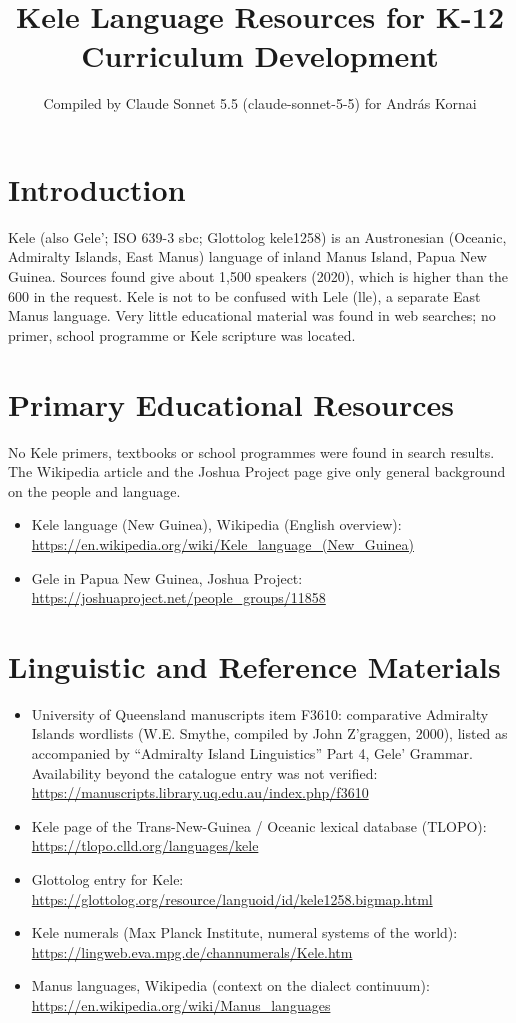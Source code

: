 \documentclass[12pt]{article}
\title{Kele Language Resources for K-12 Curriculum Development}
\author{Compiled by Claude Sonnet 5.5 (claude-sonnet-5-5) for Andr\'as Kornai}
\date{}
\begin{document}
\maketitle

\section{Introduction}
Kele (also Gele'; ISO 639-3 sbc; Glottolog kele1258) is an Austronesian (Oceanic, Admiralty Islands, East Manus) language of inland Manus Island, Papua New Guinea. Sources found give about 1,500 speakers (2020), which is higher than the 600 in the request. Kele is not to be confused with Lele (lle), a separate East Manus language. Very little educational material was found in web searches; no primer, school programme or Kele scripture was located.

\section{Primary Educational Resources}
No Kele primers, textbooks or school programmes were found in search results. The Wikipedia article and the Joshua Project page give only general background on the people and language.
\begin{itemize}
\item Kele language (New Guinea), Wikipedia (English overview): \url{https://en.wikipedia.org/wiki/Kele_language_(New_Guinea)}
\item Gele in Papua New Guinea, Joshua Project: \url{https://joshuaproject.net/people_groups/11858}
\end{itemize}

\section{Linguistic and Reference Materials}
\begin{itemize}
\item University of Queensland manuscripts item F3610: comparative Admiralty Islands wordlists (W.E. Smythe, compiled by John Z'graggen, 2000), listed as accompanied by ``Admiralty Island Linguistics'' Part 4, Gele' Grammar. Availability beyond the catalogue entry was not verified: \url{https://manuscripts.library.uq.edu.au/index.php/f3610}
\item Kele page of the Trans-New-Guinea / Oceanic lexical database (TLOPO): \url{https://tlopo.clld.org/languages/kele}
\item Glottolog entry for Kele: \url{https://glottolog.org/resource/languoid/id/kele1258.bigmap.html}
\item Kele numerals (Max Planck Institute, numeral systems of the world): \url{https://lingweb.eva.mpg.de/channumerals/Kele.htm}
\item Manus languages, Wikipedia (context on the dialect continuum): \url{https://en.wikipedia.org/wiki/Manus_languages}
\end{itemize}
\end{document}

